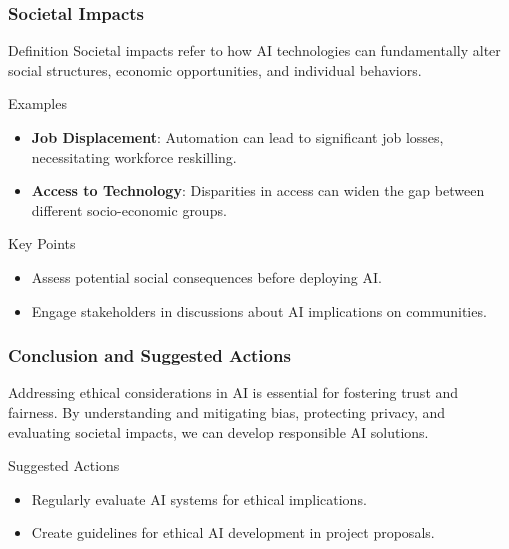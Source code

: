 \documentclass[aspectratio=169]{beamer}
\begin{document}
\begin{frame}[fragile]
    \frametitle{Societal Impacts}
    \begin{block}{Definition}
        Societal impacts refer to how AI technologies can fundamentally alter social structures, economic opportunities, and individual behaviors.
    \end{block}

    \begin{block}{Examples}
        \begin{itemize}
            \item \textbf{Job Displacement}: Automation can lead to significant job losses, necessitating workforce reskilling.
            \item \textbf{Access to Technology}: Disparities in access can widen the gap between different socio-economic groups.
        \end{itemize}
    \end{block}

    \begin{block}{Key Points}
        \begin{itemize}
            \item Assess potential social consequences before deploying AI.
            \item Engage stakeholders in discussions about AI implications on communities.
        \end{itemize}
    \end{block}
\end{frame}

\begin{frame}[fragile]
    \frametitle{Conclusion and Suggested Actions}
    Addressing ethical considerations in AI is essential for fostering trust and fairness. By understanding and mitigating bias, protecting privacy, and evaluating societal impacts, we can develop responsible AI solutions.

    \begin{block}{Suggested Actions}
        \begin{itemize}
            \item Regularly evaluate AI systems for ethical implications.
            \item Create guidelines for ethical AI development in project proposals.
        \end{itemize}
    \end{block}
\end{frame}
\end{document}
